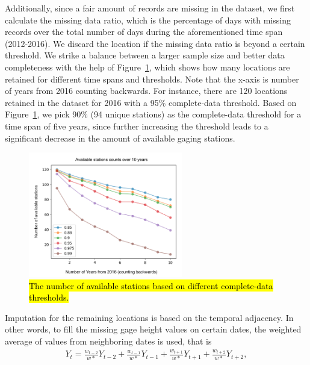 Additionally, since a fair amount of records are missing in the dataset, we first calculate the   missing data ratio, which is the percentage of days with missing records over the total number of days during the aforementioned time span (2012-2016). We discard the location if the missing data ratio is beyond a certain threshold. We strike a balance between a larger sample size and better data completeness with the help of Figure~\ref{missing_data}, which shows how many locations are retained for different time spans and thresholds. Note that the x-axis is number of years from 2016 counting backwards. For instance, there are 120 locations retained in the dataset for 2016 with a 95\% complete-data threshold. Based on Figure~\ref{missing_data}, we pick 90\% (94 unique stations) as the complete-data threshold for a time span of five years, since further increasing the threshold leads to a significant decrease in the amount of available gaging stations. \\

\begin{figure}[htbp]
\begin{center}
\includegraphics[width=0.6\textwidth]{../images/station_counts_by_year.png}
\caption{\hl{The number of available stations based on different complete-data thresholds.}}
\label{missing_data}
\end{center}
\end{figure}

Imputation for the remaining locations is based on the temporal adjacency. In other words, to fill the missing gage height values on certain dates, the weighted average of values from neighboring dates is used, that is
\begin{align*}
  Y_t = \frac{w_{t-2}}{w*} Y_{t-2} + \frac{w_{t-1}}{w*}Y_{t-1} + \frac{w_{t+1}}{w*}Y_{t+1} + \frac{w_{t+2}}{w*}Y_{t+2},
\end{align*} 

